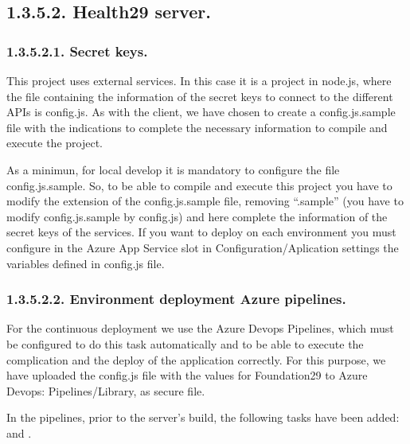 \documentclass[letterpaper,10pt,english]{sphinxmanual}
\begin{document}
\subsection{1.3.5.2. Health29 server.}
\label{\detokenize{pages/Environments/Build_deploy:health29-server}}

\subsubsection{1.3.5.2.1. Secret keys.}
\label{\detokenize{pages/Environments/Build_deploy:id1}}
This project uses external services. In this case it is a project in node.js, where the file containing the information of the secret keys to connect to the different APIs is config.js. As with the client, we have chosen to create a config.js.sample file with the indications to complete the necessary information to compile and execute the project.

As a minimun, for local develop it is mandatory to configure the file config.js.sample. So, to be able to compile and execute this project you have to modify the extension of the config.js.sample file, removing “.sample” (you have to modify config.js.sample by config.js) and here complete the information of the secret keys of the services. If you want to deploy on each environment you must configure in the Azure App Service slot in Configuration/Aplication settings the variables defined in config.js file.


\subsubsection{1.3.5.2.2. Environment deployment \textendash{} Azure pipelines.}
\label{\detokenize{pages/Environments/Build_deploy:id2}}
For the continuous deployment we use the Azure Devops Pipelines, which must be configured to do this task automatically and to be able to execute the complication and the deploy of the application correctly.
For this purpose, we have uploaded the config.js file with the values for Foundation29 to Azure Devops: Pipelines/Library, as secure file.

In the pipelines, prior to the server’s build, the following tasks have been added:  and .
\end{document}

